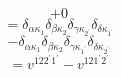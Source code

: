 \documentclass[12pt]{article}
\begin{document}
\begin{equation}
    +0
\end{equation}
\begin{equation}
    =\delta _{\alpha  \kappa _{1}}\delta _{\beta  \kappa _{2}}\delta _{\gamma  \kappa _{2^{\prime}}}\delta _{\delta  \kappa _{1^{\prime}}}
\end{equation}
\begin{equation}
    -\delta _{\alpha  \kappa _{1}}\delta _{\beta  \kappa _{2}}\delta _{\gamma  \kappa _{1^{\prime}}}\delta _{\delta  \kappa _{2^{\prime}}}
\end{equation}
\begin{equation}
    =v^{122^{\prime}1^{\prime}}-v^{121^{\prime}2^{\prime}}
\end{equation}
    
\end{document}

